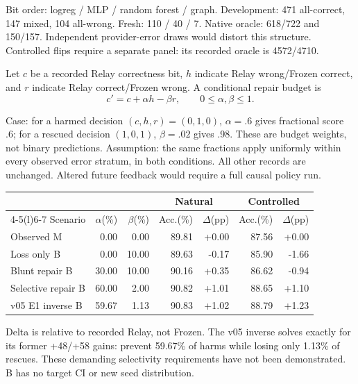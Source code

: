 \documentclass[10pt,letterpaper]{article}
\newcommand{\B}[1]{{\color{GuideBlue}#1}}
\newcommand{\note}[1]{{\fontsize{8.5}{10.5}\selectfont #1\par}}
\newcommand{\sect}[1]{\vspace{5pt}{\large\bfseries #1}\par\vspace{2pt}}
\newenvironment{clean}{\begin{center}\fontsize{9.5}{11.5}\selectfont\setlength{\tabcolsep}{6pt}\renewcommand{\arraystretch}{1.06}}{\end{center}}
\begin{document}
\note{Bit order: logreg / MLP / random forest / graph. Development: 471 all-correct, 147 mixed, 104 all-wrong. Fresh: 110 / 40 / 7. Native oracle: 618/722 and 150/157. Independent provider-error draws would distort this structure. Controlled flips require a separate panel: its recorded oracle is 4572/4710.}
\newpage
\sect{E1--E2 / body Table 4 and Figure 3: one shared budget}
Let $c$ be a recorded Relay correctness bit, $h$ indicate Relay wrong/Frozen correct,
and $r$ indicate Relay correct/Frozen wrong. A conditional repair budget is
$$c'=c+\alpha h-\beta r,\qquad 0\leq\alpha,\beta\leq1.$$
\note{Case: for a harmed decision $(c,h,r)=(0,1,0)$, $\alpha=.6$ gives fractional score .6;
for a rescued decision $(1,0,1)$, $\beta=.02$ gives .98. These are budget weights, not binary predictions.
Assumption: the same fractions apply uniformly within every observed error stratum, in both conditions.
All other records are unchanged. Altered future feedback would require a full causal policy run.}
\par\noindent\begin{minipage}{\linewidth}\end{minipage}\par
\begin{clean}\begin{tabular}{@{}lrrrrrr@{}}
\toprule
& & & \multicolumn{2}{c}{Natural} & \multicolumn{2}{c}{Controlled} \\ \cmidrule(lr){4-5}\cmidrule(l){6-7} Scenario & $\alpha$(\%) & $\beta$(\%) & Acc.(\%) & $\Delta$(pp) & Acc.(\%) & $\Delta$(pp) \\
\midrule
Observed M & 0.00 & 0.00 & 89.81 & +0.00 & 87.56 & +0.00 \\
\B{Loss only B} & \B{0.00} & \B{10.00} & \B{89.63} & \B{-0.17} & \B{85.90} & \B{-1.66} \\
\B{Blunt repair B} & \B{30.00} & \B{10.00} & \B{90.16} & \B{+0.35} & \B{86.62} & \B{-0.94} \\
\B{Selective repair B} & \B{60.00} & \B{2.00} & \B{90.82} & \B{+1.01} & \B{88.65} & \B{+1.10} \\
\B{v05 E1 inverse B} & \B{59.67} & \B{1.13} & \B{90.83} & \B{+1.02} & \B{88.79} & \B{+1.23} \\
\bottomrule\end{tabular}\end{clean}
\note{Delta is relative to recorded Relay, not Frozen. The v05 inverse solves exactly for its former +48/+58 gains: prevent 59.67\% of harms while losing only 1.13\% of rescues. These demanding selectivity requirements have not been demonstrated. B has no target CI or new seed distribution.}
\end{document}
